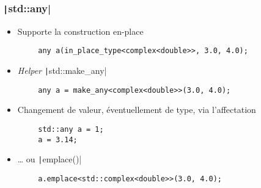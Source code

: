 \documentclass[C++.tex]{subfiles}
\begin{document}
\begin{frame}[fragile]
	\frametitle{\texttt|std::any|}
	\begin{itemize}
		\item Supporte la construction en-place
	\end{itemize}

	\begin{verbatim}
		any a(in_place_type<complex<double>>, 3.0, 4.0);
	\end{verbatim}

	\begin{itemize}
		\item \textit{Helper} \texttt|std::make_any|
	\end{itemize}

	\begin{verbatim}
		any a = make_any<complex<double>>(3.0, 4.0);
	\end{verbatim}

	\begin{itemize}
		\item Changement de valeur, éventuellement de type, via l'affectation
	\end{itemize}

	\begin{verbatim}
		std::any a = 1;
		a = 3.14;
	\end{verbatim}

	\begin{itemize}
		\item \ldots{} ou \texttt|emplace()|
	\end{itemize}

	\begin{verbatim}
		a.emplace<std::complex<double>>(3.0, 4.0);
	\end{verbatim}



\end{frame}
\end{document}
